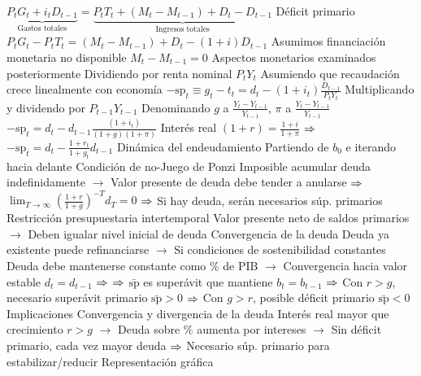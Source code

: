 \documentclass{nuevotema}
\begin{document}
\begin{esquemal}
				\4[]  $\underbrace{P_t G_t + i_t D_{t-1}}_{\text{Gastos totales}}= \underbrace{P_t T_t + (M_t - M_{t-1}) + D_t - D_{t-1}}_{\text{Ingresos totales}}$
				\4 Déficit primario
				\4[] $P_t G_t - P_t T_t = (M_t - M_{t-1}) + D_t - (1+i) D_{t-1}$
				\4 Asumimos financiación monetaria no disponible
				\4[] $M_t - M_{t-1} = 0$
				\4[] Aspectos monetarios examinados posteriormente
				\4 Dividiendo por renta nominal $P_t Y_t$
				\4[] Asumiendo que recaudación crece linealmente con economía
				\4[] $-\text{sp}_t \equiv g_t - t_t = d_t - (1+i_t) \frac{D_{t-1}}{P_t Y_t}$
				\4 Multiplicando y dividendo por $P_{t-1} Y_{t-1}$
				\4[] Denominando $g$ a $\frac{Y_t - Y_{t-1}}{Y_{t-1}}$, $\pi$ a $\frac{Y_t - Y_{t-1}}{Y_{t-1}}$
				\4[] $-\text{sp}_t =  d_t -  d_{t-1} \frac{(1+i_t)}{(1+g)(1+\pi)}$
				\4[] Interés real $(1+r) = \frac{1+i}{1+\pi}$
				\4[] $\Rightarrow$ $-\text{sp}_t = d_t - \frac{1+r_t}{1+g_t} d_{t-1}$
				\4 Dinámica del endeudamiento
				\4[] 
				\4[] Partiendo de $b_0$ e iterando hacia delante
				\4[] 
				\4 Condición de no-Juego de Ponzi
				\4[] Imposible acumular deuda indefinidamente
				\4[] $\to$ Valor presente de deuda debe tender a anularse
				\4[] $\Rightarrow$ $\lim_{T \to \infty} \left( \frac{1+r}{1+g} \right)^{-T} d_T = 0$
				\4[] $\Rightarrow$ Si hay deuda, serán necesarios súp. primarios
				\4 Restricción presupuestaria intertemporal
				\4[] Valor presente neto de saldos primarios
				\4[] $\to$ Deben igualar nivel inicial de deuda
				\4[] 
				\4 Convergencia de la deuda
				\4[] Deuda ya existente puede refinanciarse
				\4[] $\to$ Si condiciones de sostenibilidad constantes
				\4[] Deuda debe mantenerse constante como \% de PIB
				\4[] $\to$ Convergencia hacia valor estable
				\4[] $d_t=d_{t-1}$ $\Rightarrow$ 
				\4[] $\Rightarrow$ $\bar{\text{sp}}$ es superávit que mantiene $b_t = b_{t-1}$
				\4[] $\Rightarrow$ Con $r>g$, necesario superávit primario $\bar{\text{sp}} > 0$
				\4[] $\Rightarrow$ Con $g>r$, posible déficit primario $\bar{\text{sp}} < 0$
			\3 Implicaciones
				\4 Convergencia y divergencia de la deuda
				\4[] Interés real mayor que crecimiento $r>g$
				\4[] $\to$ Deuda sobre \% aumenta por intereses
				\4[] $\to$ Sin déficit primario, cada vez mayor deuda
				\4[] $\Rightarrow$ Necesario súp. primario para estabilizar/reducir
				\4[] Representación gráfica

\end{esquemal}
\end{document}
